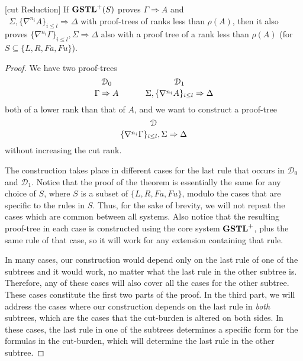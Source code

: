 \begin{thm}\label{thm:gstl-cut-reduction}[cut Reduction]
  If $\mathbf{GSTL}^+(S)$ proves $\Gamma \Rightarrow A$ and\\\ $\Sigma , \{\nabla^{n_i} A\}_{i \leq l} \Rightarrow \Delta$ with proof-trees of ranks less than $\rho(A)$, then it also proves $\{\nabla^{n_i} \Gamma\}_{i \leq l} , \Sigma \Rightarrow \Delta$ also with a proof tree of a rank less than $\rho(A)$ (for $S \subseteq \{L, R, Fa, Fu\}$).
  \end{thm}
  \begin{proof}
    We have two proof-trees
    \[
      \genfrac{}{}{0pt}{}{\mathcal{D}_0}{\Gamma \Rightarrow A}
      \hspace{3em}
      \genfrac{}{}{0pt}{}{\mathcal{D}_1}{\Sigma , \{\nabla^{n_i} A\}_{i \leq l} \Rightarrow \Delta}
    \]
    both of a lower rank than that of $A$, and we want to construct a proof-tree
    \[\genfrac{}{}{0pt}{}{\mathcal{D}}{\{\nabla^{n_i} \Gamma\}_{i \leq l} , \Sigma \Rightarrow \Delta} \]
    without increasing the cut rank.
  
    The construction takes place in different cases for the last rule that occurs in $\mathcal{D}_0$ and $\mathcal{D}_1$. Notice that the proof of the theorem is essentially the same for any choice of $S$, where $S$ is a subset of $\{L, R, Fa, Fu\}$, modulo the cases that are specific to the rules in $S$. Thus, for the sake of brevity, we will not repeat the cases which are common between all systems. Also notice that the resulting proof-tree in each case is constructed using the core system $\mathbf{GSTL}^+$, plus the same rule of that case, so it will work for any extension containing that rule.
  
    In many cases, our construction would depend only on the last rule of one of the subtrees and it would work, no matter what the last rule in the other subtree is. Therefore, any of these cases will also cover all the cases for the other subtree. These cases constitute the first two parts of the proof. In the third part, we will address the cases where our construction depends on the last rule in \emph{both} subtrees, which are the cases that the cut-burden is altered on both sides. In these cases, the last rule in one of the subtrees determines a specific form for the formulas in the cut-burden, which will determine the last rule in the other subtree.
  

\end{proof}
